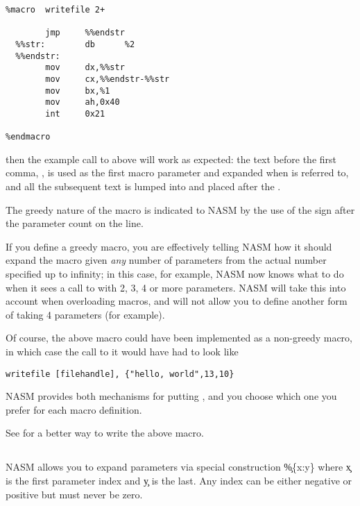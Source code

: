 \begin{lstlisting}
%macro  writefile 2+

        jmp     %%endstr
  %%str:        db      %2
  %%endstr:
        mov     dx,%%str
        mov     cx,%%endstr-%%str
        mov     bx,%1
        mov     ah,0x40
        int     0x21

%endmacro
\end{lstlisting}

then the example call to  above will work as expected:
the text before the first comma, \code{[filehandle]}, is used as the
first macro parameter and expanded when  is referred to, and
all the subsequent text is lumped into  and placed after the
.

The greedy nature of the macro is indicated to NASM by the use of
the \code{+} sign after the parameter count on the
 line.

If you define a greedy macro, you are effectively telling NASM how
it should expand the macro given \emph{any} number of parameters from
the actual number specified up to infinity; in this case, for
example, NASM now knows what to do when it sees a call to
 with 2, 3, 4 or more parameters. NASM will take this
into account when overloading macros, and will not allow you to
define another form of  taking 4 parameters (for
example).

Of course, the above macro could have been implemented as a
non-greedy macro, in which case the call to it would have had to
look like

\begin{lstlisting}
writefile [filehandle], {"hello, world",13,10}
\end{lstlisting}

NASM provides both mechanisms for putting , and you choose which one you prefer for each macro
definition.

See  for a better way to write the above macro.

\subsection{}
\label{subsec:mlmacrange}

NASM allows you to expand parameters via special construction \c{\%\{x:y\}}
where \c{x} is the first parameter index and \c{y} is the last. Any index can
be either negative or positive but must never be zero.

